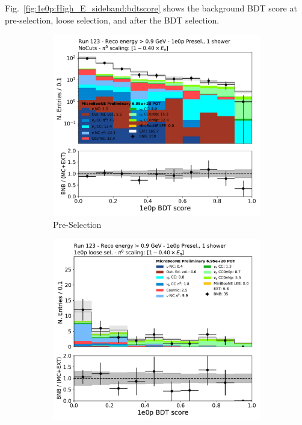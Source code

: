 Fig.~\ref{fig:1e0p:High_E_sideband:bdtscore} shows the background BDT score at pre-selection, loose selection, and after the BDT selection.  
\begin{figure}[H]
    \centering
    \begin{subfigure}{0.3\textwidth}
    \includegraphics[width=1.0\textwidth]{1e0p/High_E_Sideband/bkg_score_log.pdf}
    \caption{Pre-Selection}
    \end{subfigure}
    \begin{subfigure}{0.3\textwidth}
    \includegraphics[width=1.0\textwidth]{1e0p/High_E_Sideband/loose_selection/bkg_score.pdf}

\end{subfigure}
\end{figure}
